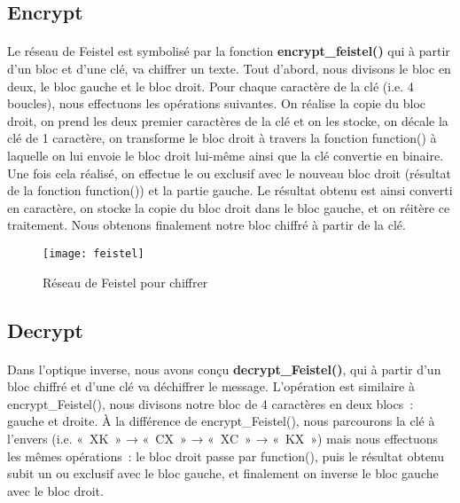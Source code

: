 \documentclass[11pt,fleqn]{book} %
\begin{document}
\subsection{Encrypt}

\paragraph{}Le réseau de Feistel est symbolisé par la fonction \textbf{encrypt\_feistel()} qui à partir d'un bloc et d'une clé, va chiffrer un texte. Tout d'abord, nous divisons le bloc en deux, le bloc gauche et le bloc droit. Pour chaque caractère de la clé (i.e. 4 boucles), nous effectuons les opérations suivantes. On réalise la copie du bloc droit, on prend les deux premier caractères de la clé et on les stocke, on décale la clé de 1 caractère, on transforme le bloc droit à travers la fonction function() à laquelle on lui envoie le bloc droit lui-même ainsi que la clé convertie en binaire. Une fois cela réalisé, on effectue le ou exclusif avec le nouveau bloc droit (résultat de la fonction function()) et la partie gauche. Le résultat obtenu est ainsi converti en caractère, on stocke la copie du bloc droit dans le bloc gauche, et on réitère ce traitement. Nous obtenons finalement notre bloc chiffré à partir de la clé.

\begin{figure}[h]
\centering\texttt{[image: feistel]}
\caption{Réseau de Feistel pour chiffrer}
\end{figure}


\subsection{Decrypt}

\paragraph{}Dans l'optique inverse, nous avons conçu \textbf{decrypt\_Feistel()}, qui à partir d'un bloc chiffré et d'une clé va déchiffrer le message. L'opération est similaire à encrypt\_Feistel(), nous divisons notre bloc de 4 caractères en deux blocs : gauche et droite. À la différence de encrypt\_Feistel(), nous parcourons la clé à l'envers (i.e. « XK » → « CX » → « XC » → « KX ») mais nous effectuons les mêmes opérations : le bloc droit passe par function(), puis le résultat obtenu subit un ou exclusif avec le bloc gauche, et finalement on inverse le bloc gauche avec le bloc droit.
\end{document}
